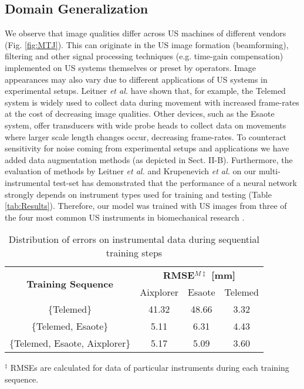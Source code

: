 \documentclass[journal,twoside,web]{ieeecolor}
\begin{document}
\subsection*{Domain Generalization}
\label{sec:generalization}
We observe that image qualities differ across US machines of different vendors (Fig. \ref{fig:MTJ}). This can originate in the US image formation (beamforming), filtering and other signal processing techniques (e.g. time-gain compensation) implemented on US systems themselves or preset by operators. Image appearances may also vary due to different applications of US systems in experimental setups. Leitner \textit{et al.} \cite{j:Leitner2019} have shown that, for example, the Telemed system is widely used to collect data during movement with increased frame-rates at the cost of decreasing image qualities. Other devices, such as the Esaote system, offer transducers with wide probe heads to collect data on movements where larger scale length changes occur, decreasing frame-rates. To counteract sensitivity for noise coming from experimental setups and applications we have added data augmentation methods (as
depicted in Sect. II-B). Furthermore, the evaluation of methods by Leitner \textit{et al.} \cite{c:LeitnerJarolim2020} and Krupenevich \textit{et al.} \cite{j:Krupenevich2021} on our multi-instrumental test-set has demonstrated that the performance of a neural network strongly depends on instrument types used for training and testing (Table \ref{tab:Results}). Therefore, our model was trained with US images from three of the four most common US instruments in biomechanical research \cite{j:Leitner2019, j:Hooren2020}. 
\setlength{\tabcolsep}{0.32em}
\begin{table}[!ht]
\caption{Distribution of errors on instrumental data during sequential training steps}
\label{tab:results_Inst}
    \vspace{-0.2cm} 
    \renewcommand{\arraystretch}{1.20}
    \begin{center}
    \begin{tabular}{cccc}
\toprule
        \multirow{2}{*}{\textbf{Training Sequence}}
        &\multicolumn{3}{c}{\textbf{RMSE$^{M\ddagger}$ [mm]}}\\
&Aixplorer
        &Esaote
        &Telemed\\ 
\midrule
        \rule{0pt}{12pt}\{Telemed\}
        &41.32
        &48.66
        &3.32\\
\rule{0pt}{12pt}\{Telemed, Esaote\}
        &5.11
        &6.31
        &4.43\\
\rule{0pt}{12pt}\{Telemed, Esaote, Aixplorer\}
        &5.17
        &5.09
        &3.60\\
\bottomrule
    \end{tabular}
    \end{center}
        \begin{tablenotes}
        \item $^\ddagger$ RMSEs are calculated for data of particular instruments during each training sequence.\\
    \end{tablenotes}
\vspace{-0.3cm}
\end{table} 
\end{document}
